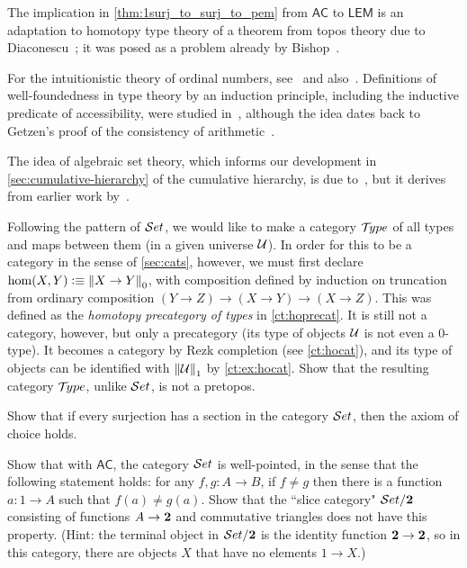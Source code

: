 The implication in \autoref{thm:1surj_to_surj_to_pem} from $\mathsf{AC}$ to $\mathsf{LEM}$ is an adaptation to homotopy type
theory of a theorem from topos theory due to Diaconescu~\cite{Diaconescu}; it was posed as a problem already by Bishop~\cite[Problem
2,p58]{Bishop1967}.

For the intuitionistic theory of ordinal numbers, see~\cite{taylor:ordinals} and also~\cite{JoyalMoerdijk1995}.
Definitions of well-foundedness in type theory by an induction principle, including the inductive predicate of accessibility, were studied in~\cite{Huet80,Paulson86,Nordstrom88}, although the idea dates back to Getzen's proof of the consistency of arithmetic~\cite{Gentzen36}.

The idea of algebraic set theory, which informs our development in \autoref{sec:cumulative-hierarchy} of the cumulative hierarchy, is due to~\cite{JoyalMoerdijk1995}, but it derives from earlier work by~\cite{AczelCZF}.


\sectionExercises

\begin{ex}
Following the pattern of $\mathcal{S}et$, we would like to make a category $\mathcal{T}\!ype$ of all types and maps between them (in a given universe $\mathcal{U}$).  In order for this to be a category in the sense of \autoref{sec:cats}, however, we must first declare $\hom(X,Y) \vcentcolon\equiv \mathopen{}\left\Vert X\to Y\right\Vert_{0}\mathclose{}$, with composition defined by induction on truncation from ordinary composition $(Y\to Z) \to (X\to Y) \to (X\to Z)$.  This was defined as the \emph{homotopy precategory of types} in \autoref{ct:hoprecat}.  It is still not a category, however, but only a precategory (its type of objects $\mathcal{U}$ is not even a $0$-type).  It becomes a category by Rezk completion (see \autoref{ct:hocat}), and its type of objects can be identified with $\mathopen{}\left\Vert \mathcal{U}\right\Vert_{1}\mathclose{}$ by \autoref{ct:ex:hocat}.  Show that the resulting category $\mathcal{T}\!ype$, unlike $\mathcal{S}et$, is not a pretopos.
\end{ex}

\begin{ex}
  Show that if every surjection has a section in the category $\mathcal{S}et$, then the axiom of choice holds.
\end{ex}

\begin{ex}
Show that with $\mathsf{AC}$, the category $\mathcal{S}et$ is well-pointed, in the sense that the following statement holds: for any $f, g : A\to B$, if $f \neq g$ then there is a function $a : 1\to A$ such that $f(a) \neq g(a)$.  Show that the ``slice category" $\mathcal{S}et/\mathbf{2}$ consisting of functions $A\to \mathbf{2}$ and commutative triangles does not have this property. (Hint: the terminal object in $\mathcal{S}et/\mathbf{2}$ is the identity function $\mathbf{2} \to \mathbf{2}$, so in this category, there are objects $X$ that have no elements $1\to X$.)
\end{ex}

